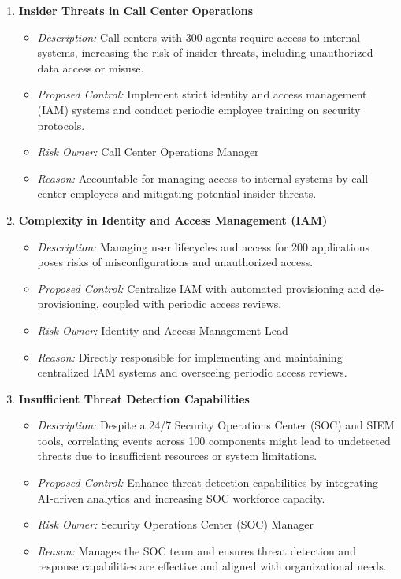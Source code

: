\begin{enumerate}
    \item \textbf{Insider Threats in Call Center Operations}
    \begin{itemize}
        \item \textit{Description:} Call centers with 300 agents require access to internal systems, increasing the risk of insider threats, including unauthorized data access or misuse.
        \item \textit{Proposed Control:} Implement strict identity and access management (IAM) systems and conduct periodic employee training on security protocols.
        \item \textit{Risk Owner:} Call Center Operations Manager
        \item \textit{Reason:} Accountable for managing access to internal systems by call center employees and mitigating potential insider threats.
    \end{itemize}

    \item \textbf{Complexity in Identity and Access Management (IAM)}
    \begin{itemize}
        \item \textit{Description:} Managing user lifecycles and access for 200 applications poses risks of misconfigurations and unauthorized access.
        \item \textit{Proposed Control:} Centralize IAM with automated provisioning and de-provisioning, coupled with periodic access reviews.
        \item \textit{Risk Owner:} Identity and Access Management Lead
        \item \textit{Reason:} Directly responsible for implementing and maintaining centralized IAM systems and overseeing periodic access reviews.
    \end{itemize}

    \item \textbf{Insufficient Threat Detection Capabilities}
    \begin{itemize}
        \item \textit{Description:} Despite a 24/7 Security Operations Center (SOC) and SIEM tools, correlating events across 100 components might lead to undetected threats due to insufficient resources or system limitations.
        \item \textit{Proposed Control:} Enhance threat detection capabilities by integrating AI-driven analytics and increasing SOC workforce capacity.
        \item \textit{Risk Owner:} Security Operations Center (SOC) Manager
        \item \textit{Reason:} Manages the SOC team and ensures threat detection and response capabilities are effective and aligned with organizational needs.
    \end{itemize}
\end{enumerate}


